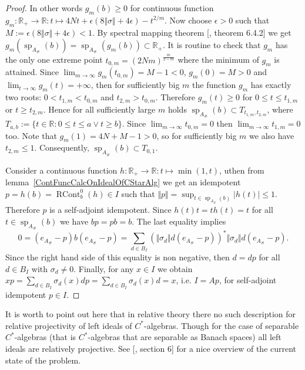 \begin{proof}
In other words $g_m(b)\geq 0$ for continuous function
$g_m:\mathbb{R}_+\to\mathbb{R}:t\mapsto
4Nt+\epsilon(8\Vert\sigma\Vert+4\epsilon)-t^{2/m}$. Now choose $\epsilon>0$ such
that $M:=\epsilon(8\Vert\sigma\Vert+4\epsilon)<1$.  By spectral mapping theorem
[\cite{HelLectAndExOnFuncAn}, theorem 6.4.2] we get
$g_m(\operatorname{sp}_{A_\#}(b))
=\operatorname{sp}_{A_\#}(g_m(b))\subset\mathbb{R}_+$.
It is routine to check that $g_m$ has the only one extreme point
$t_{0,m}={(2Nm)}^{\frac{m}{2-m}}$ where the minimum of $g_m$ is attained. Since
$\lim_{m\to\infty} g_m(t_{0,m})=M-1<0$, $g_m(0)=M>0$ and $\lim_{t\to\infty}
g_m(t)=+\infty$, then for sufficiently big $m$ the function $g_m$ has exactly
two roots: $0<t_{1,m}<t_{0,m}$ and $t_{2,m} > t_{0,m}$. Therefore $g_m(t)\geq 0$
for $0\leq t\leq t_{1,m}$ or $t\geq t_{2,m}$. Hence for all sufficiently large
$m$ holds $\operatorname{sp}_{A_\#}(b)\subset T_{t_{1,m},t_{2,m}}$, 
where $T_{a, b}:=\{t\in\mathbb{R} : 0\leq t \leq a \vee t \geq b\}$. 
Since $\lim_{m\to\infty} t_{0,m}=0$ then $\lim_{m\to\infty} t_{1,m}=0$ too. 
Note that $g_m(1)=4N+M-1>0$, so for sufficiently big $m$ we also 
have $t_{2,m}\leq 1$. Consequently,
$\operatorname{sp}_{A_\#}(b)\subset T_{0,1}$.

Consider a continuous function $h:\mathbb{R}_+\to\mathbb{R}:t\mapsto\min(1, t)$,
uthen from lemma~\ref{ContFuncCalcOnIdealOfCStarAlg} we get an idempotent
$p=h(b)=\operatorname{RCont}_b^0(h)\in I$ such that $\Vert
p\Vert=\sup_{t\in\operatorname{sp}_{A_\#}(b)}|h(t)|\leq 1$. Therefore $p$ is a
self-adjoint idempotent. Since $h(t)t=th(t)=t$ for all $t\in
\operatorname{sp}_{A_\#}(b)$ we have $bp=pb=b$. The last equality implies
$$
0=(e_{A_\#}-p)b(e_{A_\#}-p)
=\sum_{d\in B_I}
    {(\Vert\sigma_d\Vert d(e_{A_\#}-p))}^*\Vert\sigma_d\Vert d(e_{A_\#}-p).
$$
Since the right hand side of this equality is non negative, then $d=dp$ for all
$d\in B_I$ with $\sigma_d\neq 0$. Finally, for any $x\in I$ we obtain
$xp=\sum_{d\in B_I}\sigma_d(x)dp=\sum_{d\in B_I}\sigma_d(x)d=x$, i.e. $I=Ap$,
for self-adjoint idempotent $p\in I$.
\end{proof}

It is worth to point out here that in relative theory there no such description
for relative projectivity of left ideals of $C^*$-algebras. Though for the case
of separable $C^*$-algebras (that is $C^*$-algebras that are separable as Banach
spaces) all left ideals are relatively projective. See
[\cite{LykProjOfBanAndCStarAlgsOfContFld}, section 6] for a nice overview of the
current state of the problem.


